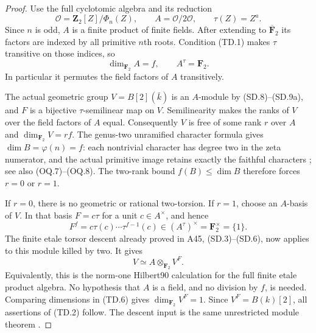 \begin{proof}
Use the full cyclotomic algebra and its reduction
\[
 \mathcal O=\mathbf Z_2[Z]/\Phi_n(Z),\qquad
 A=\mathcal O/2\mathcal O,\qquad \tau(Z)=Z^a.
 \tag{TD.3}
\]
Since $n$ is odd, $A$ is a finite product of finite fields.
After extending to $\overline{\mathbf F}_2$ its factors are
indexed by all primitive $n$th roots. Condition (TD.1) makes
$\tau$ transitive on those indices, so
\[
              \dim_{\mathbf F_2}A=f,\qquad A^\tau=\mathbf F_2.
 \tag{TD.4}
\]
In particular it permutes the field factors of $A$ transitively.

The actual geometric group $V=B[2](\bar k)$ is an $A$-module
by (SD.8)--(SD.9a), and $F$ is a bijective
$\tau$-semilinear map on $V$.
Semilinearity makes the ranks of $V$ over the field factors
of $A$ equal. Consequently $V$ is free of some rank $r$ over
$A$ and $\dim_{\mathbf F_2}V=rf$.
The genus-two unramified character formula gives
$\dim B=\varphi(n)=f$: each nontrivial character has degree
two in the zeta numerator, and the actual primitive image
retains exactly the faithful characters
\cite[B.2]{A1run}; see also (OQ.7)--(OQ.8).
The two-rank bound $f(B)\le\dim B$
\cite[Remark~8.5, the bound $r\le g$]{MilneAV}
therefore forces $r=0$ or $r=1$.

If $r=0$, there is no geometric or rational two-torsion.
If $r=1$, choose an $A$-basis of $V$. In that basis
$F=c\tau$ for a unit $c\in A^\times$, and hence
\[
 F^f=c\tau(c)\cdots\tau^{f-1}(c)
                         \in(A^\tau)^\times=\mathbf F_2^\times=
                         \{1\}.
 \tag{TD.5}
\]
The finite etale torsor descent already proved in A45,
(SD.3)--(SD.6), now applies to this module killed by two.
It gives
\[
                  V\simeq A\otimes_{\mathbf F_2}V^F.
 \tag{TD.6}
\]
Equivalently, this is the norm-one Hilbert90 calculation for
the full finite etale product algebra. No hypothesis that
$A$ is a field, and no division by $f$, is needed.
Comparing dimensions in (TD.6) gives
$\dim_{\mathbf F_2}V^F=1$.
Since $V^F=B(k)[2]$, all assertions of (TD.2) follow.
The descent input is the same unrestricted module theorem
\cite[Proposition~35.3.9, Tag~\texttt{023N}]{Stacks023N}.
\end{proof}

